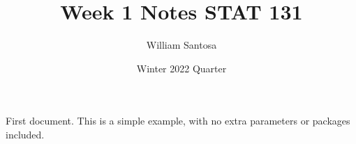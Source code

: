 \documentclass[12pt, letterpaper]{article}
\title{Week 1 Notes STAT 131}
\author{William Santosa}
\date{Winter 2022 Quarter}
\begin{document}
\maketitle

First document. This is a simple example, with no 
extra parameters or packages included.
\end{document}
